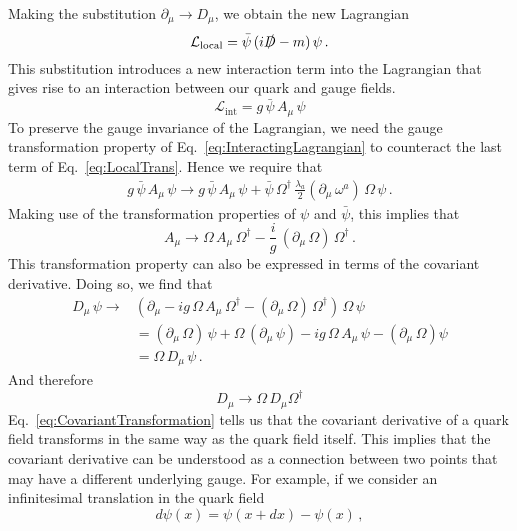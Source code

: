 Making the substitution $\partial_\mu\rightarrow D_\mu$, we obtain the new Lagrangian
%
\begin{equation}
\mathcal{L}_\text{local} = \bar{\psi}\,(i\slashed{D}-m)\,\psi\,.
\end{equation}
%
This substitution introduces a new interaction term into the Lagrangian that gives rise to an interaction between our quark and gauge fields.
%
\begin{equation}
\mathcal{L}_\text{int} = g\,\bar{\psi}\,A_\mu\,\psi
\label{eq:InteractingLagrangian}
\end{equation}
%
To preserve the gauge invariance of the Lagrangian, we need the gauge transformation property of Eq.~\ref{eq:InteractingLagrangian} to counteract the last term of Eq.~\ref{eq:LocalTrans}. Hence we require that
%
\begin{align}
g\,\bar{\psi}\,A_\mu\,\psi \rightarrow g\,\bar{\psi}\,A_\mu\,\psi + \bar{\psi}\,\Omega^\dag\,\frac{\lambda_a}{2}(\partial_\mu\,\omega^a)\,\Omega\,\psi\, .
\end{align}
%
Making use of the transformation properties of $\psi$ and $\bar{\psi}$, this implies that
%
\begin{equation}
A_\mu\rightarrow \Omega\,A_\mu\,\Omega^\dag - \frac{i}{g}\,(\partial_\mu\,\Omega)\,\Omega^\dag\, . 
\label{eq:GaugePotentialTrans}
\end{equation}
%
This transformation property can also be expressed in terms of the covariant derivative. Doing so, we find that
%
\begin{align}
D_\mu\,\psi \rightarrow &\left(\partial_\mu -ig\,\Omega\,A_\mu\,\Omega^\dag - (\partial_\mu\,\Omega)\,\Omega^\dag\right)\,\Omega\,\psi\nonumber\\
&= (\partial_\mu\,\Omega)\,\psi + \Omega\,(\partial_\mu\,\psi) - ig\,\Omega\,A_\mu\,\psi - (\partial_\mu\,\Omega)\psi\nonumber\\
&=\Omega\,D_\mu\,\psi\, .\label{eq:CovariantTransformation}
\end{align}
%
And therefore
%
\begin{equation}
D_{\mu}\rightarrow\Omega\,D_\mu \Omega^\dag
\end{equation}
%
Eq.~\ref{eq:CovariantTransformation} tells us that the covariant derivative of a quark field transforms in the same way as the quark field itself. This implies that the covariant derivative can be understood as a connection between two points that may have a different underlying gauge. For example, if we consider an infinitesimal translation in the quark field
%
\begin{equation*}
d\psi(x) = \psi(x+dx)-\psi(x)\, ,
\end{equation*} 
